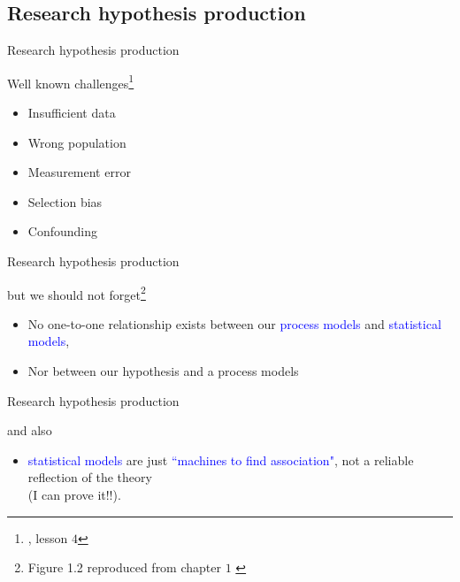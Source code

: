 \subsection{Research hypothesis production}
%
%
\begin{frame}[t, negative]
	\subsectionpage
\end{frame}
%
%
\begin{lhframe}[rhgraphic={\texttt{[image: challenges.jpg]}}]
	{Research hypothesis production}
	
	Well known challenges\footnote{\citet{Hernan_2020}, lesson $4$}
	\begin{itemize}
		\item Insufficient data
		\item Wrong population
		\item Measurement error
		\item Selection bias
		\item Confounding
	\end{itemize} 
\end{lhframe}
%
%
\begin{lhframe}[rhgraphic={\texttt{[image: process\_models.png]}}]
	{Research hypothesis production}
	
	but we should not forget\footnote{Figure 1.2 reproduced from chapter $1$ \citet{McElreath_2022}}
	\begin{itemize}
		\item No one-to-one relationship exists between our \textcolor{blue}{process models} and \textcolor{blue}{statistical models},
		\item Nor between our hypothesis and a process models
	\end{itemize} 
\end{lhframe}
%
%
\begin{lhframe}[rhgraphic={\texttt{[image: tide\_machine.jpg]}}]
	{Research hypothesis production}
	
	and also
	\begin{itemize}
		\item \textcolor{blue}{statistical models} are just \textcolor{blue}{``machines to find association"}, not a reliable reflection of the theory \\
		\alert{(I can prove it!!)}.
	\end{itemize} 
\end{lhframe}
%
%
